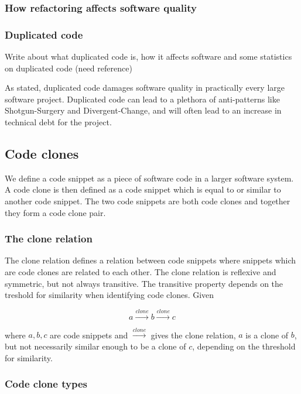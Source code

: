 \documentclass[12pt]{article}
\begin{document}
\subsubsection{How refactoring affects software quality}

\subsubsection{Duplicated code}

Write about what duplicated code is, how it affects software and some statistics on
duplicated code (need reference)

As stated, duplicated code damages software quality in practically every large software
project. Duplicated code can lead to a plethora of anti-patterns like Shotgun-Surgery and
Divergent-Change, and will often lead to an increase in technical debt for the
project.\cite[99]{fowlerrefactoring}

\subsection{Code clones}

We define a code snippet as a piece of software code in a larger software system. A code
clone is then defined as a code snippet which is equal to or similar to another code
snippet. The two code snippets are both code clones and together they form a code clone
pair. 

\subsubsection{The clone relation}
The clone relation defines a relation between code snippets where snippets which are
code clones are related to each other. The clone relation is reflexive and symmetric, but
not always transitive. The transitive property depends on the treshold for similarity when
identifying code clones. Given

$$a \xrightarrow{clone} b \xrightarrow{clone} c$$

where $a,b,c$ are code snippets and $\xrightarrow{clone}$ gives the clone relation, $a$ is
a clone of $b$, but not necessarily similar enough to be a clone of $c$, depending on the
threshold for similarity.

\subsubsection{Code clone types}
\end{document}
